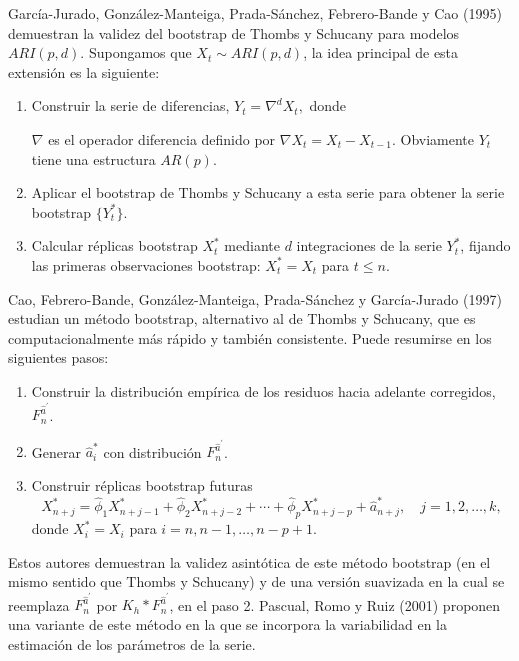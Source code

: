 \documentclass[
]{book}
\theoremstyle{break}
\theoremstyle{nonumberplain}
\begin{document}
García-Jurado, González-Manteiga, Prada-Sánchez, Febrero-Bande y Cao
(1995) demuestran la validez del bootstrap de Thombs y Schucany para
modelos \(ARI(p,d)\). Supongamos que \(X_{t}\sim ARI(p,d)\), la idea
principal de esta extensión es la siguiente:

\begin{enumerate}
\def\labelenumi{\arabic{enumi}.}
\item
  Construir la serie de diferencias, \(Y_{t}=\nabla^{d}X_{t},\) donde

  \(\nabla\) es el operador diferencia definido por
  \(\nabla X_{t}=X_{t}-X_{t-1}\). Obviamente \(Y_{t}\) tiene una
  estructura \(AR(p)\).
\item
  Aplicar el bootstrap de Thombs y Schucany a esta serie para obtener
  la serie bootstrap \(\{Y_{t}^{\ast}\}\).
\item
  Calcular réplicas bootstrap \(X_{t}^{\ast}\) mediante \(d\)
  integraciones de la serie \(Y_{t}^{\ast}\), fijando las primeras
  observaciones bootstrap: \(X_{t}^{\ast}=X_{t}\) para \(t\leq n\).
\end{enumerate}

Cao, Febrero-Bande, González-Manteiga, Prada-Sánchez y García-Jurado
(1997) estudian un método bootstrap, alternativo al de Thombs y
Schucany, que es computacionalmente más rápido y también consistente.
Puede resumirse en los siguientes pasos:

\begin{enumerate}
\def\labelenumi{\arabic{enumi}.}
\item
  Construir la distribución empírica de los residuos hacia adelante
  corregidos, \(F_n^{\widehat{a}^{\prime}}\).
\item
  Generar \(\widehat{a}_i^{\ast}\) con distribución \(F_n^{
  \widehat{a}^{\prime}}\).
\item
  Construir réplicas bootstrap futuras
  \[X_{n+j}^{\ast}=\widehat{\phi}_1X_{n+j-1}^{\ast}
  +\widehat{\phi}_2X_{n+j-2}^{\ast} + \cdots +\widehat{\phi}_{p}X_{n+j-p}^{\ast}
  +\widehat{a}_{n+j}^{\ast},\quad j=1,2,\ldots ,k,\]
  donde \(X_i^{\ast}=X_i\) para \(i=n,n-1,\ldots ,n-p+1.\)
\end{enumerate}

Estos autores demuestran la validez asintótica de este método bootstrap
(en el mismo sentido que Thombs y Schucany) y de una versión suavizada
en la cual se reemplaza \(F_n^{\widehat{a}^{\prime}}\) por
\(K_{h}\ast F_n^{\widehat{a}^{\prime}}\), en el paso 2. Pascual, Romo y
Ruiz (2001) proponen una variante de este método en la que se incorpora
la variabilidad en la estimación de los parámetros de la serie.
\end{document}
